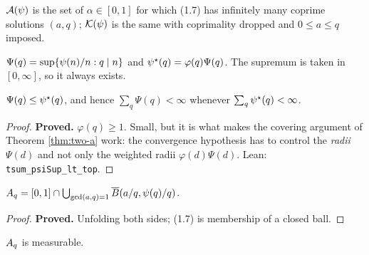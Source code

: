 \begin{definition}[$\A(\ps)$ and $\K(\ps)$]
  \label{def:seta}
  \leanok
  $\A(\ps)$ is the set of $\alpha \in [0,1]$ for which (1.7) has infinitely many
  coprime solutions $(a,q)$; $\K(\ps)$ is the same with coprimality dropped and
  $0 \leq a \leq q$ imposed.
\end{definition}

\begin{definition}
  \label{def:psistar}
  \leanok
  $\Psi(q) = \sup \{ \psi(n)/n : q \mid n \}$ and $\psi^{\star}(q) = \varphi(q)\Psi(q)$.
  The supremum is taken in $[0,\infty]$, so it always exists.
\end{definition}

\begin{lemma}[$\Psi \leq \pstar$]
  \label{lem:psisup-le-psistar}
  \leanok
  $\Psi(q) \leq \psi^{\star}(q)$, and hence $\sum_q \Psi(q) < \infty$ whenever
  $\sum_q \psi^{\star}(q) < \infty$.
\end{lemma}

\begin{proof}
  \leanok
  \textbf{Proved.} $\varphi(q) \geq 1$. Small, but it is what makes the covering argument
  of Theorem \ref{thm:two-a} work: the convergence hypothesis has to control the
  \emph{radii} $\Psi(d)$ and not only the weighted radii $\varphi(d)\Psi(d)$.
  Lean: \texttt{tsum\_psiSup\_lt\_top}.
\end{proof}

\begin{lemma}
  \label{lem:setaq-union}
  \leanok
  $A_q = [0,1] \cap \bigcup_{\gcd(a,q)=1} \overline{B}(a/q, \psi(q)/q)$.
\end{lemma}

\begin{proof}
  \leanok
  \textbf{Proved.} Unfolding both sides; (1.7) is membership of a closed ball.
\end{proof}

\begin{lemma}[Measurability of $\Aq$]
  \label{lem:measurable-setaq}
  \leanok
  $\Aq$ is measurable.
\end{lemma}

